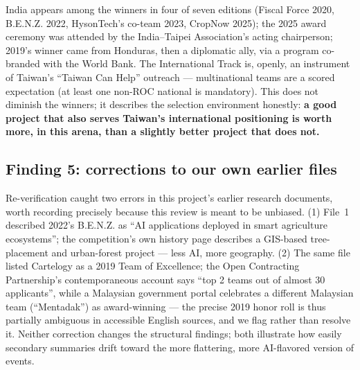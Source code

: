 India appears among the winners in four of seven editions (Fiscal Force 2020,
B.E.N.Z. 2022, HysonTech's co-team 2023, CropNow 2025); the 2025 award
ceremony was attended by the India--Taipei Association's acting
chairperson\cite{focuscrop}; 2019's winner came from Honduras, then a
diplomatic ally, via a program co-branded with the World Bank\cite{cost}. The
International Track is, openly, an instrument of Taiwan's ``Taiwan Can Help''
outreach --- multinational teams are a scored expectation (at least one
non-ROC national is mandatory\cite{handbook}). This does not diminish the
winners; it describes the selection environment honestly: \textbf{a good
project that also serves Taiwan's international positioning is worth more, in
this arena, than a slightly better project that does not.}

\subsection{Finding 5: corrections to our own earlier files}\label{sec:corrections}

Re-verification caught two errors in this project's earlier research
documents, worth recording precisely because this review is meant to be
unbiased. (1) File~1 described 2022's B.E.N.Z. as ``AI applications deployed
in smart agriculture ecosystems''; the competition's own history page
describes a GIS-based tree-placement and urban-forest project\cite{hist2023}
--- less AI, more geography. (2) The same file listed Cartelogy as a 2019
Team of Excellence; the Open Contracting Partnership's contemporaneous account
says ``top 2 teams out of almost 30 applicants''\cite{ocpcartel}, while a
Malaysian government portal celebrates a different Malaysian team
(``Mentadak'') as award-winning --- the precise 2019 honor roll is thus
partially ambiguous in accessible English sources, and we flag rather than
resolve it. Neither correction changes the structural findings; both
illustrate how easily secondary summaries drift toward the more flattering,
more AI-flavored version of events.
